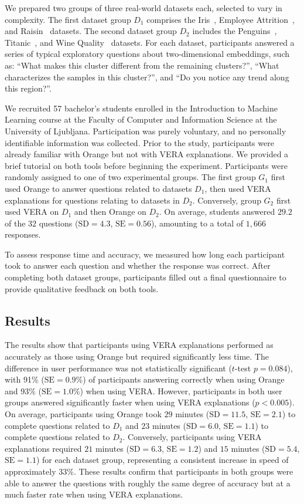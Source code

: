 \documentclass[lettersize,journal]{IEEEtran}
\begin{document}
We prepared two groups of three real-world datasets each, selected to vary in complexity.
The first dataset group $D_1$ comprises the Iris~\cite{Anderson1936}, Employee Attrition~\cite{IbmEmployeeAttrition}, and Raisin~\cite{RaisinDataset} datasets. The second dataset group $D_2$ includes the Penguins~\cite{Horst2020}, Titanic~\cite{Dawson1995}, and Wine Quality~\cite{Cortez2009} datasets. For each dataset, participants answered a series of typical exploratory questions about two-dimensional embeddings, such as: ``What makes this cluster different from the remaining clusters?'', ``What characterizes the samples in this cluster?'', and ``Do you notice any trend along this region?''.

We recruited 57 bachelor's students enrolled in the Introduction to Machine Learning course at the Faculty of Computer and Information Science at the University of Ljubljana.
Participation was purely voluntary, and no personally identifiable information was collected.
Prior to the study, participants were already familiar with Orange but not with VERA explanations. We provided a brief tutorial on both tools before beginning the experiment.
Participants were randomly assigned to one of two experimental groups. The first group $G_1$ first used Orange to answer questions related to datasets $D_1$, then used VERA explanations for questions relating to datasets in $D_2$. Conversely, group $G_2$ first used VERA on $D_1$ and then Orange on $D_2$. On average, students answered $29.2$ of the $32$ questions ($\text{SD}= 4.3$, $\text{SE}=0.56$), amounting to a total of $1,666$ responses.

To assess response time and accuracy, we measured how long each participant took to answer each question and whether the response was correct. After completing both dataset groups, participants filled out a final questionnaire to provide qualitative feedback on both tools.

\subsection{Results}

The results show that participants using VERA explanations performed as accurately as those using Orange but required significantly less time.
The difference in user performance was not statistically significant ($t$-test $p=0.084$), with 91\% ($\text{SE}=0.9\%$) of participants answering correctly when using Orange and 93\% ($\text{SE}=1.0\%$) when using VERA.
However, participants in both user groups answered significantly faster when using VERA explanations ($p<0.005$). On average, participants using Orange took $29$ minutes ($\text{SD}= 11.5$, $\text{SE}=2.1$) to complete questions related to $D_1$ and $23$ minutes ($\text{SD}= 6.0$, $\text{SE}=1.1$) to complete questions related to $D_2$. Conversely, participants using VERA explanations required $21$ minutes ($\text{SD}= 6.3$, $\text{SE}=1.2$) and $15$ minutes ($\text{SD}=5.4$, $\text{SE}=1.1$) for each dataset group, representing a consistent increase in speed of approximately 33\%.
These results confirm that participants in both groups were able to answer the questions with roughly the same degree of accuracy but at a much faster rate when using VERA explanations.
\end{document}
